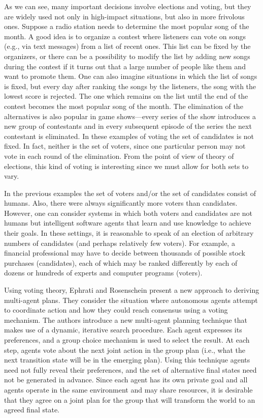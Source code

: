As we can see, many important decisions involve elections and voting, but they are widely used not only in high-impact situations, but also in more frivolous ones.
Suppose a radio station needs to determine the most popular song of the month.
A good idea is to organize a contest where listeners can vote on songs (e.g., via text messages) from a list of recent ones.
This list can be fixed by the organizers, or there can be a possibility to modify the list by adding new songs during the contest if it turns out that a large number of people like them and want to promote them.
One can also imagine situations in which the list of songs is fixed, but every day after ranking the songs by the listeners, the song with the lowest score is rejected.
The one which remains on the list until the end of the contest becomes the most popular song of the month.
The elimination of the alternatives is also popular in game shows---every series of the show introduces a new group of contestants and in every subsequent episode of the series the next contestant is eliminated.
In these examples of voting the set of candidates is not fixed.
In fact, neither is the set of voters, since one particular person may not vote in each round of the elimination.
From the point of view of theory of elections, this kind of voting is interesting since we must allow for both sets to vary.

In the previous examples the set of voters and/or the set of candidates consist of humans.
Also, there were always significantly more voters than candidates.
However, one can consider systems in which both voters and candidates are not humans but intelligent software agents that learn and use knowledge to achieve their goals.
In these settings, it is reasonable to speak of an election of arbitrary numbers of candidates (and perhaps relatively few voters).
For example, a financial professional may have to decide between thousands of possible stock purchases (candidates), each of which may be ranked differently by each of dozens or hundreds of experts and computer programs (voters).

Using voting theory, Ephrati and Rosenschein \cite{ephrati} present a new approach to deriving multi-agent plans.
They consider the situation where autonomous agents attempt to coordinate action and how they could reach consensus using a voting mechanism.
The authors introduce a new multi-agent planning technique that makes use of a dynamic, iterative search procedure.
Each agent expresses its preferences, and a group choice mechanism is used to select the result.
At each step, agents vote about the next joint action in the group plan (i.e., what the next transition state will be in the e\-mer\-ging plan).
Using this technique agents need not fully reveal their preferences, and the set of alternative final states need not be generated in advance.
Since each agent has its own private goal and all agents operate in the same environment and may share resources, it is desirable that they agree on a joint plan for the group that will transform the world to an agreed final state.

